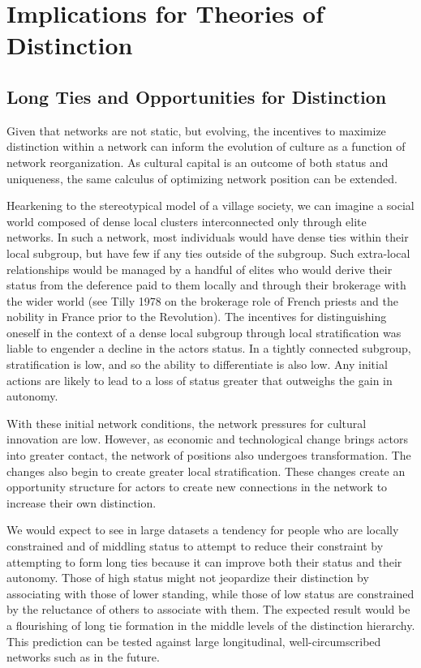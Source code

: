 \documentclass[12pt]{article}
\begin{document}
\section{Implications for Theories of Distinction}
\subsection{Long Ties and Opportunities for Distinction}
Given that networks are not static, but evolving, the incentives to maximize distinction within a network can inform the evolution of culture as a function of network reorganization. As cultural capital is an outcome of both status and uniqueness, the same calculus of optimizing network position can be extended.

Hearkening to the stereotypical model of a village society, we can imagine a social world composed of dense local clusters interconnected only through elite networks. In such a network, most individuals would have dense ties within their local subgroup, but have few if any ties outside of the subgroup. Such extra-local relationships would be managed by a handful of elites who would derive their status from the deference paid to them locally and through their brokerage with the wider world (see Tilly 1978 on the brokerage role of French priests and the nobility in France prior to the Revolution). The incentives for distinguishing oneself in the context of a dense local subgroup through local stratification was liable to engender a decline in the actors status. In a tightly connected subgroup, stratification is low, and so the ability to differentiate is also low. Any initial actions are likely to lead to a loss of status greater that outweighs the gain in autonomy. 

With these initial network conditions, the network pressures for cultural innovation are low. However, as economic and technological change brings actors into greater contact, the network of positions also undergoes transformation. The changes also begin to create greater local stratification. These changes create an opportunity structure for actors to create new connections in the network to increase their own distinction. 

We would expect to see in large datasets a tendency for people who are locally constrained and of middling status to attempt to reduce their constraint by attempting to form long ties because it can improve both their status and their autonomy. Those of high status might not jeopardize their distinction by associating with those of lower standing, while those of low status are constrained by the reluctance of others to associate with them. The expected result would be a flourishing of long tie formation in the middle levels of the distinction hierarchy. This prediction can be tested against large longitudinal, well-circumscribed networks such as \citep{bearman2004chains} in the future. 
\end{document}
